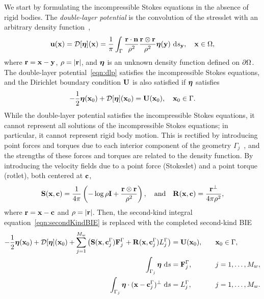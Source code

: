 \documentclass[preprint, 10pt]{elsarticle}
\begin{document}
We start by formulating the incompressible Stokes equations in the
absence of rigid bodies.  The {\em double-layer potential} is the
convolution of the stresslet with an arbitrary density
function~\cite{Ladyzhenskaya1963, Pozrikidis1992},
\begin{align}
  \label{eqn:dlp}
  {\mathbf{u}}({\mathbf{x}}) = {\mathcal{D}}[{\boldsymbol\eta}]({\mathbf{x}}) = \frac{1}{\pi}\int_{\Gamma}
  \frac{{\mathbf{r}}\cdot{\mathbf{n}}}{\rho^2}\frac{{\mathbf{r}} \otimes {\mathbf{r}}}{\rho^2}
  {\boldsymbol\eta}({\mathbf{y}})~\text{d}s_{{\mathbf{y}}}, \quad {\mathbf{x}} \in \Omega,
\end{align}
where ${\mathbf{r}} = {\mathbf{x}} - {\mathbf{y}}$, $\rho=|{\mathbf{r}}|$, and ${\boldsymbol\eta}$ is an unknown density
function defined on ${\partial}\Omega$.  The double-layer
potential~\eqref{eqn:dlp} satisfies the incompressible Stokes equations,
and the Dirichlet boundary condition ${\mathbf{U}}$ is also satisfied if
${\boldsymbol\eta}$ satisfies~\cite{Pozrikidis1992}
\begin{align}
  -\frac{1}{2} {\boldsymbol\eta}({\mathbf{x}}_0) + {\mathcal{D}}[{\boldsymbol\eta}]({\mathbf{x}}_0) = {\mathbf{U}}({\mathbf{x}}_0), 
    \quad {\mathbf{x}}_0 \in \Gamma.
  \label{eqn:secondKindBIE}
\end{align}
While the double-layer potential satisfies the incompressible Stokes
equations, it cannot represent all solutions of the incompressible
Stokes equations; in particular, it cannot represent rigid body motion.
This is rectified by introducing point forces and torques due to each
interior component of the geometry $\Gamma_j$~\cite{Power1987,
Power1993}, and the strengths of these forces and torques are related to
the density function.  By introducing the velocity fields due to a point
force (Stokeslet) and a point torque (rotlet), both centered at ${\mathbf{c}}$,
\begin{align*}
  \mathbf{S}({\mathbf{x}},{\mathbf{c}}) = \frac{1}{4\pi}\left(-\log\rho\mathbf{I} + 
  \frac{{\mathbf{r}} \otimes {\mathbf{r}}}{\rho^2}\right), \quad \text{and} \quad
  \mathbf{R}({\mathbf{x}},{\mathbf{c}}) = \frac{{\mathbf{r}}^\perp}{4\pi\rho^2},
\end{align*}
where ${\mathbf{r}} = {\mathbf{x}} - {\mathbf{c}}$ and $\rho = |{\mathbf{r}}|$.  Then, the second-kind
integral equation~\eqref{eqn:secondKindBIE} is replaced with the
completed second-kind BIE
\begin{equation}
  \label{eqn:completed_DLP}
  \begin{split}
  -\frac{1}{2}{\boldsymbol\eta}({\mathbf{x}}_0) + {\mathcal{D}}[{\boldsymbol\eta}]({\mathbf{x}}_0) + 
    \sum_{j=1}^{M_w} \left(\mathbf{S}({\mathbf{x}},{\mathbf{c}}^\Gamma_j){\mathbf{F}}^\Gamma_j + 
      \mathbf{R}({\mathbf{x}},{\mathbf{c}}^\Gamma_j)L^\Gamma_j\right) &= {\mathbf{U}}({\mathbf{x}}_0),
      \quad &&{\mathbf{x}}_0 \in \Gamma, \\
  \int_{\Gamma_j} {\boldsymbol\eta}~\text{d}s &= {\mathbf{F}}^\Gamma_j, 
      &&j=1,\ldots,M_w, \\
  \int_{\Gamma_j} {\boldsymbol\eta}\cdot ({\mathbf{x}} - {\mathbf{c}}^\Gamma_j)^\perp~\text{d}s &=   
      L^\Gamma_j, &&j=1,\ldots,M_w.
  \end{split}
\end{equation}
\end{document}
